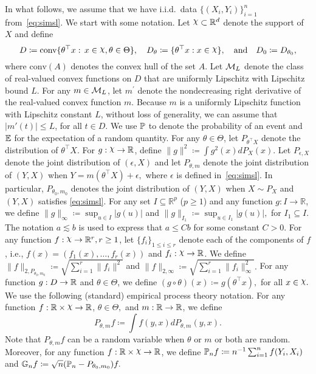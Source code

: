 In what follows, we assume that we have i.i.d.~data $\{(X_i,Y_i)\}_{i=1}^{n}$ from~\eqref{eq:simsl}. We start with some notation. Let  $\rchi \subset \mathbb{R}^d$ denote the support of $X$ and define
\begin{equation}\label{eq:Defn_Q_D}
D \coloneqq\text{conv} \{\theta^{\top}x :\,  x\in\rchi, \theta\in \Theta\},\quad D_{\theta}\coloneqq \{ \theta^\top x: x \in \rchi\}, \quad\text{and}\quad D_{0} \coloneqq D_{\theta_0},
\end{equation}
 where $\text{conv}(A)$ denotes the convex hull of the set $A$. Let $\mathcal{M}_L$ denote the class of real-valued convex functions on $D$ that are uniformly Lipschitz with Lipschitz bound $L.$ For any $m\in \mathcal{M}_L$, let $m^\prime$ denote the nondecreasing right derivative of the real-valued convex function $m$. Because $m$ is a uniformly Lipschitz function with Lipschitz constant $L$, without loss of generality, we can assume that $|m'(t)|\leq L$, for all $t\in D.$ We use $\mathbb{P}$ to denote the probability of an event and $\mathbb{E}$ for the expectation of a random quantity. For any $\theta\in\Theta$, let $P_{\theta^\top X}$ denote the distribution of $\theta^\top X$.  For $g : \rchi \to \mathbb{R}$, define $  \|g\|^2 \coloneqq \int g^2(x) dP_X(x).$ Let $P_{\epsilon, X}$ denote the joint distribution of $(\epsilon, X)$ and let $P_{\theta,m}$ denote the joint distribution of $(Y,X)$ when $Y = m(\theta^\top X) +\epsilon,$ where $\epsilon$ is defined in~\eqref{eq:simsl}. In particular,  $P_{\theta_0, m_0}$ denotes the joint distribution of $(Y,X)$ when  $X\sim P_X$ and $(Y,X)$ satisfies \eqref{eq:simsl}.  For any set $I \subseteq \mathbb{R}^p$ ($p\ge 1$) and any function $g: I \to \mathbb{R}$, we define $\|g\|_{\infty} \coloneqq \sup_{u \in I} |g(u)|$ and $\|g\|_{I_1} \coloneqq \sup_{u \in I_1} |g(u)|,$ for $I_1 \subseteq I.$  The notation $a\lesssim b$ is used to express that $a\le C b$ for some  constant $C>0$.  For any function $f:\rchi\rightarrow\R^r, r\ge1$, let $\{f_i\}_{1\le i \le r}$ denote each of the components of $f$, i.e.,  $f(x)= (f_1(x), \ldots, f_r(x))$ and  $f_i: \rchi \to \R$. We define $\| f\|_{2, P_{\theta_0, m_0}}\coloneqq \sqrt{ \sum_{i=1}^r \|f_i\|^2}$  and $\| f\|_{2, \infty}\coloneqq \sqrt{ \sum_{i=1}^r \|f_i\|^2_\infty}.$ For any  function $g:D\rightarrow\mathbb{R}$ and $\theta\in\Theta$, we define $(g\circ\theta)(x) \coloneqq g(\theta^{\top}x),$ for all $ x \in \rchi.$ We use the following (standard) empirical process theory notation. For any function $f: \R\times \rchi\rightarrow \R$, $\theta \in \Theta,$ and $m :\mathbb{R} \rightarrow \mathbb{R}$, we define \[P_{\theta, m} f \coloneqq \int f(y,x) dP_{\theta, m}(y,x).\] Note that   $P_{\theta, m} f$ can be a random variable when $\theta$ or $m$ or both are random. Moreover, for any function $f: \R\times \rchi\to \R$, we define $\mathbb{P}_nf \coloneqq n^{-1}\sum_{i=1}^n f(Y_i, X_i)$ and $\mathbb{G}_n f\coloneqq {\sqrt{n}} (\mathbb{P}_n -P_{\theta_0,m_0}) f.
$
